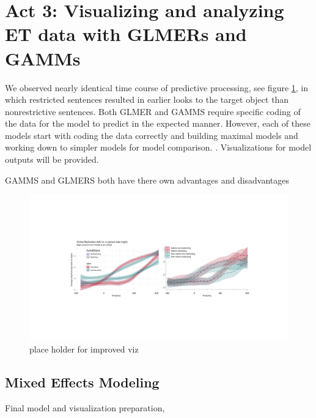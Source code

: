 \section{Act 3: Visualizing and analyzing ET data with GLMERs and GAMMs}
We observed nearly identical time course of predictive processing, see figure \ref{fig:comparitive}, in which restricted sentences resulted in earlier looks to the target object than nonrestrictive sentences. Both GLMER and GAMMS require specific coding of the data for the model to predict in the expected manner.  However, each of these models start with coding the data correctly and building maximal models and working down to simpler models for model comparison. \parencite{max model}. Visualizations for model outputs will be provided.

GAMMS and GLMERS both have there own advantages and disadvantages \parencite{Ito_Knoeferle_2022}
\begin{figure}[h]
    \centering
    \includegraphics[width=\textwidth]{figures/comparitive.jpeg}
    \caption{place holder for improved viz}
    \label{fig:comparitive}
\end{figure}

\subsection{Mixed Effects Modeling}
Final model and visualization preparation, 


